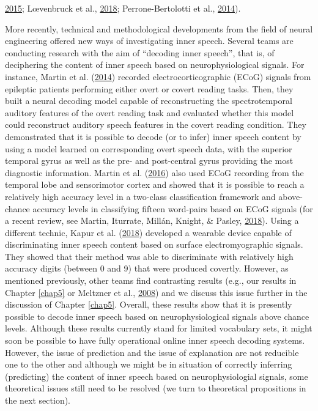 \documentclass[a4paper,12pt,twoside,onecolumn,openright,final,oldfontcommands]{memoir}
\begin{document}
\protect\hyperlink{ref-alderson-day_inner_2015}{2015}; Lœvenbruck et al., \protect\hyperlink{ref-loevenbruck_cognitive_2018}{2018}; Perrone-Bertolotti et al., \protect\hyperlink{ref-Perrone-Bertolotti2014}{2014}).

More recently, technical and methodological developments from the field of neural engineering offered new ways of investigating inner speech. Several teams are conducting research with the aim of \enquote{decoding inner speech}, that is, of deciphering the content of inner speech based on neurophysiological signals. For instance, Martin et al. (\protect\hyperlink{ref-martin_decoding_2014}{2014}) recorded electrocorticographic (ECoG) signals from epileptic patients performing either overt or covert reading tasks. Then, they built a neural decoding model capable of reconstructing the spectrotemporal auditory features of the overt reading task and evaluated whether this model could reconstruct auditory speech features in the covert reading condition. They demonstrated that it is possible to decode (or to infer) inner speech content by using a model learned on corresponding overt speech data, with the superior temporal gyrus as well as the pre- and post-central gyrus providing the most diagnostic information. Martin et al. (\protect\hyperlink{ref-martin_word_2016}{2016}) also used ECoG recording from the temporal lobe and sensorimotor cortex and showed that it is possible to reach a relatively high accuracy level in a two-class classification framework and above-chance accuracy levels in classifying fifteen word-pairs based on ECoG signals (for a recent review, see Martin, Iturrate, Millán, Knight, \& Pasley, \protect\hyperlink{ref-martin_decoding_2018}{2018}). Using a different technic, Kapur et al. (\protect\hyperlink{ref-kapur_alterego_2018}{2018}) developed a wearable device capable of discriminating inner speech content based on surface electromyographic signals. They showed that their method was able to discriminate with relatively high accuracy digits (between 0 and 9) that were produced covertly. However, as mentioned previously, other teams find contrasting results (e.g., our results in Chapter \ref{chap5} or Meltzner et al., \protect\hyperlink{ref-meltzner_speech_2008}{2008}) and we discuss this issue further in the discussion of Chapter \ref{chap5}. Overall, these results show that it is presently possible to decode inner speech based on neurophysiological signals above chance levels. Although these results currently stand for limited vocabulary sets, it might soon be possible to have fully operational online inner speech decoding systems. However, the issue of prediction and the issue of explanation are not reducible one to the other and although we might be in situation of correctly inferring (predicting) the content of inner speech based on neurophysiologial signals, some theoretical issues still need to be resolved (we turn to theoretical propositions in the next section).
\end{document}

